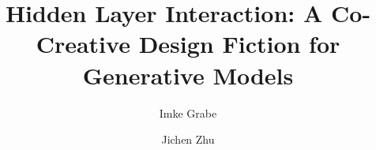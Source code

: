 \documentclass[manuscript]{acmart}
\begin{document}
\title{Hidden Layer Interaction: A Co-Creative Design Fiction for Generative Models}

\author{Imke Grabe}
\author{Jichen Zhu}



\end{document}
